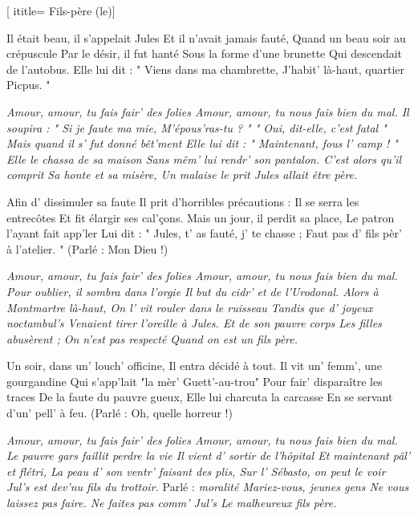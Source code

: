  [
ititle= {Fils-père (le)}]

\beginverse
Il était beau, il s'appelait Jules
Et il n'avait jamais fauté,
Quand un beau soir au crépuscule
Par le désir, il fut hanté
Sous la forme d'une brunette
Qui descendait de l'autobus.
Elle lui dit : " Viens dans ma chambrette,
J'habit' là-haut, quartier Picpus. "
\endverse

\beginverse
\textit {Amour, amour, tu fais fair' des folies
Amour, amour, tu nous fais bien du mal.
Il soupira : " Si je faute ma mie,
M'épous'ras-tu ? " " Oui, dit-elle, c'est fatal "
Mais quand il s' fut donné bêt'ment
Elle lui dit : " Maintenant, fous l' camp ! "
Elle le chassa de sa maison
Sans mêm' lui rendr' son pantalon.
C'est alors qu'il comprit
Sa honte et sa misère,
Un malaise le prit
Jules allait être père.}
\endverse

\beginverse
Afin d' dissimuler sa faute
Il prit d'horribles précautions :
Il se serra les entrecôtes
Et fit élargir ses cal'çons.
Mais un jour, il perdit sa place,
Le patron l'ayant fait app'ler
Lui dit : " Jules, t' as fauté, j' te chasse ;
Faut pas d' fils pèr' à l'atelier. " 
(Parlé : Mon Dieu !)
\endverse

\beginverse
\textit {Amour, amour, tu fais fair' des folies
Amour, amour, tu nous fais bien du mal.
Pour oublier, il sombra dans l'orgie
Il but du cidr' et de l'Urodonal.
Alors à Montmartre là-haut,
On l' vit rouler dans le ruisseau
Tandis que d' joyeux noctambul's
Venaient tirer l'oreille à Jules.
Et de son pauvre corps
Les filles abusèrent ;
On n'est pas respecté
Quand on est un fils père.}
\endverse

\beginverse
Un soir, dans un' louch' officine,
Il entra décidé à tout.
Il vit un' femm', une gourgandine
Qui s'app'lait "la mèr' Guett'-au-trou"
Pour fair' disparaître les traces
De la faute du pauvre gueux,
Elle lui charcuta la carcasse
En se servant d'un' pell' à feu. 
(Parlé : Oh, quelle horreur !)
\endverse

\beginverse
\textit {Amour, amour, tu fais fair' des folies
Amour, amour, tu nous fais bien du mal.
Le pauvre gars faillit perdre la vie
Il vient d' sortir de l'hôpital
Et maintenant pâl' et flétri,
La peau d' son ventr' faisant des plis,
Sur l' Sébasto, on peut le voir
Jul's est dev'nu fils du trottoir.}
Parlé : \textit{moralité
Mariez-vous, jeunes gens
Ne vous laissez pas faire.
Ne faites pas comm' Jul's
Le malheureux fils père.}
\endverse

\endsong
